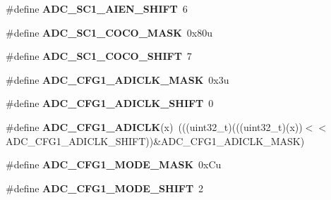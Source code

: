 \begin{DoxyCompactItemize}
\item 
\#define {\bfseries A\+D\+C\+\_\+\+S\+C1\+\_\+\+A\+I\+E\+N\+\_\+\+S\+H\+I\+FT}~6\hypertarget{group__ADC__Register__Masks_gaf2cde8fb207dd348e6313d6d0a5b3761}{}\label{group__ADC__Register__Masks_gaf2cde8fb207dd348e6313d6d0a5b3761}

\item 
\#define {\bfseries A\+D\+C\+\_\+\+S\+C1\+\_\+\+C\+O\+C\+O\+\_\+\+M\+A\+SK}~0x80u\hypertarget{group__ADC__Register__Masks_ga698a3a178a5b412febc8c0cc849e8896}{}\label{group__ADC__Register__Masks_ga698a3a178a5b412febc8c0cc849e8896}

\item 
\#define {\bfseries A\+D\+C\+\_\+\+S\+C1\+\_\+\+C\+O\+C\+O\+\_\+\+S\+H\+I\+FT}~7\hypertarget{group__ADC__Register__Masks_gad708b138ec734a371a20a990f0c9a27f}{}\label{group__ADC__Register__Masks_gad708b138ec734a371a20a990f0c9a27f}

\item 
\#define {\bfseries A\+D\+C\+\_\+\+C\+F\+G1\+\_\+\+A\+D\+I\+C\+L\+K\+\_\+\+M\+A\+SK}~0x3u\hypertarget{group__ADC__Register__Masks_ga849c3ef9995df85776d7d739475cfdd0}{}\label{group__ADC__Register__Masks_ga849c3ef9995df85776d7d739475cfdd0}

\item 
\#define {\bfseries A\+D\+C\+\_\+\+C\+F\+G1\+\_\+\+A\+D\+I\+C\+L\+K\+\_\+\+S\+H\+I\+FT}~0\hypertarget{group__ADC__Register__Masks_ga889634c9b4122a2d39f3a986688a1662}{}\label{group__ADC__Register__Masks_ga889634c9b4122a2d39f3a986688a1662}

\item 
\#define {\bfseries A\+D\+C\+\_\+\+C\+F\+G1\+\_\+\+A\+D\+I\+C\+LK}(x)~(((uint32\+\_\+t)(((uint32\+\_\+t)(x))$<$$<$A\+D\+C\+\_\+\+C\+F\+G1\+\_\+\+A\+D\+I\+C\+L\+K\+\_\+\+S\+H\+I\+FT))\&A\+D\+C\+\_\+\+C\+F\+G1\+\_\+\+A\+D\+I\+C\+L\+K\+\_\+\+M\+A\+SK)\hypertarget{group__ADC__Register__Masks_ga1f7b28bec60a20af8775724a4b33a6e6}{}\label{group__ADC__Register__Masks_ga1f7b28bec60a20af8775724a4b33a6e6}

\item 
\#define {\bfseries A\+D\+C\+\_\+\+C\+F\+G1\+\_\+\+M\+O\+D\+E\+\_\+\+M\+A\+SK}~0x\+Cu\hypertarget{group__ADC__Register__Masks_gad484c90743265c228af52bf695aaec83}{}\label{group__ADC__Register__Masks_gad484c90743265c228af52bf695aaec83}

\item 
\#define {\bfseries A\+D\+C\+\_\+\+C\+F\+G1\+\_\+\+M\+O\+D\+E\+\_\+\+S\+H\+I\+FT}~2\hypertarget{group__ADC__Register__Masks_ga0dc0ce86ab632e5fa2344da9f8617f64}{}\label{group__ADC__Register__Masks_ga0dc0ce86ab632e5fa2344da9f8617f64}


\end{DoxyCompactItemize}
